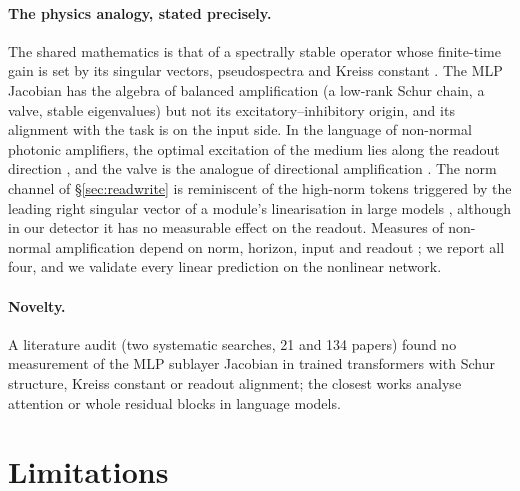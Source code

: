 \documentclass[10pt]{article}
\begin{document}
\paragraph{The physics analogy, stated precisely.} The shared mathematics is that of a spectrally stable operator whose finite-time gain is
set by its singular vectors, pseudospectra and Kreiss constant \citep{trefethen2005spectra,schmid2007nonmodal,symon2018nonnormality}.
The MLP Jacobian has the algebra of balanced amplification (a low-rank Schur chain, a valve, stable eigenvalues) but not its
excitatory--inhibitory origin, and its alignment with the task is on the input side. In the language of non-normal photonic amplifiers,
the optimal excitation of the medium lies along the readout direction \citep{makris2014anomalous}, and the valve is the analogue of
directional amplification \citep{midya2022topological,ramos2021topological}. The norm channel of \S\ref{sec:readwrite} is reminiscent of
the high-norm tokens triggered by the leading right singular vector of a module's linearisation in large models
\citep{wang2025demystifying}, although in our detector it has no measurable effect on the readout. Measures of
non-normal amplification depend on norm, horizon, input and readout \citep{baggio2020efficient}; we report all four, and we validate every
linear prediction on the nonlinear network.

\paragraph{Novelty.} A literature audit (two systematic searches, 21 and 134 papers) found no measurement of the MLP sublayer Jacobian in
trained transformers with Schur structure, Kreiss constant or readout alignment; the closest works analyse attention \citep{li2026transient}
or whole residual blocks \citep{fernando2026dynamics,aubry2025transformer} in language models.

\section{Limitations}
\end{document}
